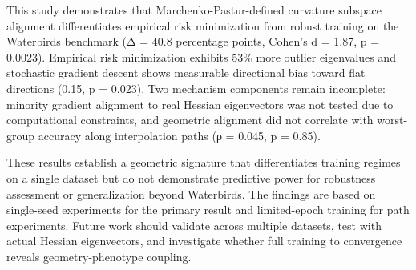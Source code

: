 
This study demonstrates that Marchenko-Pastur-defined curvature subspace alignment differentiates empirical risk minimization from robust training on the Waterbirds benchmark (Δ = 40.8 percentage points, Cohen's d = 1.87, p = 0.0023). Empirical risk minimization exhibits 53\% more outlier eigenvalues and stochastic gradient descent shows measurable directional bias toward flat directions (0.15, p = 0.023). Two mechanism components remain incomplete: minority gradient alignment to real Hessian eigenvectors was not tested due to computational constraints, and geometric alignment did not correlate with worst-group accuracy along interpolation paths (ρ = 0.045, p = 0.85).

These results establish a geometric signature that differentiates training regimes on a single dataset but do not demonstrate predictive power for robustness assessment or generalization beyond Waterbirds. The findings are based on single-seed experiments for the primary result and limited-epoch training for path experiments. Future work should validate across multiple datasets, test with actual Hessian eigenvectors, and investigate whether full training to convergence reveals geometry-phenotype coupling.
